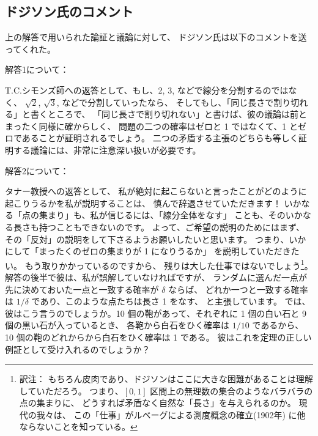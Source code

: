 \documentclass{article}
\begin{document}
\subsection*{ドジソン氏のコメント}

上の解答で用いられた論証と議論に対して、
ドジソン氏は以下のコメントを送ってくれた。

解答1について：

T.C.シモンズ師への返答として、もし、2, 3, などで線分を分割するのではなく、
$\sqrt{2}$, $\sqrt{3}$, などで分割していったなら、
そしてもし、「同じ長さで割り切れる」と書くところで、
「同じ長さで割り切れない」と書けば、彼の議論は前とまったく同様に確からしく、
問題の二つの確率はゼロと 1 ではなくて、1 とゼロであることが証明されるでしょう。
二つの矛盾する主張のどちらも等しく証明する議論には、非常に注意深い扱いが必要です。

解答2について：

タナー教授への返答として、
私が絶対に起こらないと言ったことがどのように起こりうるかを私が説明することは、
慎んで辞退させていただきます！
いかなる「点の集まり」も、私が信じるには、「線分全体をなす」
ことも、そのいかなる長さも持つこともできないのです。
よって、ご希望の説明のためにはまず、
その「反対」の説明をして下さるようお願いしたいと思います。
つまり、いかにして「まったくのゼロの集まりが 1 になりうるか」
を説明していただきたい。
もう取りかかっているのですから、
残りは大した仕事ではないでしょう\footnote{訳注：
もちろん皮肉であり、ドジソンはここに大きな困難があることは理解していただろう。
つまり、$[0, 1]$ 区間上の無理数の集合のようなバラバラの点の集まりに、
どうすれば矛盾なく自然な「長さ」を与えられるのか。
現代の我々は、
この「仕事」がルベーグによる測度概念の確立(1902年)
に他ならないことを知っている。}。
解答の後半で彼は、私が誤解していなければですが、
ランダムに選んだ一点が先に決めておいた一点と一致する確率が $\delta$ ならば、
どれか一つと一致する確率は $1/\delta$ であり、このような点たちは長さ 1 をなす、
と主張しています。
では、彼はこう言うのでしょうか。10 個の鞄があって、それぞれに
1 個の白い石と 9 個の黒い石が入っているとき、
各鞄から白石をひく確率は $1/10$ であるから、
10 個の鞄のどれからから白石をひく確率は 1 である。
彼はこれを定理の正しい例証として受け入れるのでしょうか？
\end{document}
